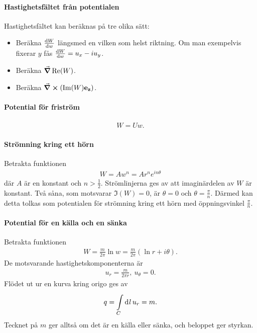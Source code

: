 \paragraph{Hastighetsfältet från potentialen}
Hastighetsfältet kan beräknas på tre olika sätt:
\begin{itemize}
	\item Beräkna $\dv{W}{w}$ längsmed en vilken som helst riktning. Om man exempelvis fixerar $y$ fås $\dv{W}{w} = u_{x} - iu_{y}$.
	\item Beräkna $\grad{\Re(W)}$.
	\item Beräkna $\curl(\Im(W)\vb{e}_{\vb{z}})$.
\end{itemize}

\paragraph{Potential för friström}
\begin{align*}
	W = Uw.
\end{align*}

\paragraph{Strömning kring ett hörn}
Betrakta funktionen
\begin{align*}
	W = Aw^{n} = Ar^{n}e^{in\theta}
\end{align*}
där $A$ är en konstant och $n > \frac{1}{2}$. Strömlinjerna ges av att imaginärdelen av $W$ är konstant. Två såna, som motsvarar $\Im(W) = 0$, är $\theta = 0$ och $\theta = \frac{\pi}{n}$. Därmed kan detta tolkas som potentialen för strömning kring ett hörn med öppningsvinkel $\frac{\pi}{n}$.

\paragraph{Potential för en källa och en sänka}
Betrakta funktionen
\begin{align*}
	W = \frac{m}{2\pi}\ln{w} = \frac{m}{2\pi}(\ln{r} + i\theta).
\end{align*}
De motsvarande hastighetskomponenterna är
\begin{align*}
	u_{r} = \frac{m}{2\pi r},\ u_{\theta} = 0.
\end{align*}
Flödet ut ur en kurva kring origo ges av
\begin{align*}
	q = \int\limits_{C}^{}\dd[]{l}u_{r} = m.
\end{align*}
Tecknet på $m$ ger alltså om det är en källa eller sänka, och beloppet ger styrkan.

